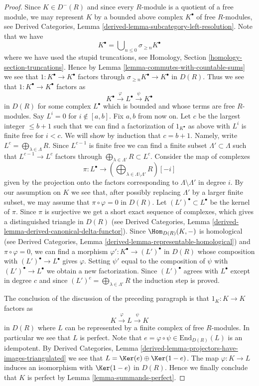 \begin{proof}
\medskip\noindent
Since $K \in D^{-}(R)$ and since every $R$-module is a quotient of a free
module, we may represent $K$ by a bounded above complex $K^\bullet$
of free $R$-modules, see
Derived Categories, Lemma \ref{derived-lemma-subcategory-left-resolution}.
Note that we have
$$
K^\bullet = \bigcup\nolimits_{n \leq 0} \sigma_{\geq n}K^\bullet
$$
where we have used the stupid truncations, see
Homology, Section \ref{homology-section-truncations}.
Hence by Lemma \ref{lemma-commutes-with-countable-sums} we see that
$1 : K^\bullet \to K^\bullet$ factors through
$\sigma_{\geq n}K^\bullet \to K^\bullet$ in $D(R)$.
Thus we see that $1 : K^\bullet \to K^\bullet$ factors as
$$
K^\bullet \xrightarrow{\varphi} L^\bullet \xrightarrow{\psi} K^\bullet
$$
in $D(R)$ for some complex $L^\bullet$ which is bounded and whose terms
are free $R$-modules. Say $L^i = 0$ for $i \not \in [a, b]$.
Fix $a, b$ from now on. Let $c$ be the largest integer $\leq b + 1$
such that we can find a factorization of $1_{K^\bullet}$ as above
with $L^i$ is finite free for $i < c$. We will show by induction that
$c = b + 1$. Namely, write $L^c = \bigoplus_{\lambda \in \Lambda} R$.
Since $L^{c - 1}$ is finite free we can find a finite subset
$\Lambda' \subset \Lambda$ such that $L^{c - 1} \to L^c$ factors
through $\bigoplus_{\lambda \in \Lambda'} R \subset L^c$. Consider the
map of complexes
$$
\pi :
L^\bullet
\longrightarrow
(\bigoplus\nolimits_{\lambda \in \Lambda \setminus \Lambda'} R)[-i]
$$
given by the projection onto the factors corresponding to
$\Lambda \setminus \Lambda'$ in degree $i$.
By our assumption on $K$ we see that, after possibly replacing $\Lambda'$ by
a larger finite subset, we may assume that $\pi \circ \varphi = 0$
in $D(R)$. Let $(L')^\bullet \subset L^\bullet$ be the kernel of $\pi$.
Since $\pi$ is surjective we get a short exact sequence of complexes,
which gives a distinguished triangle in $D(R)$ (see
Derived Categories, Lemma \ref{derived-lemma-derived-canonical-delta-functor}).
Since $\Hom_{D(R)}(K, -)$ is homological (see
Derived Categories, Lemma \ref{derived-lemma-representable-homological})
and $\pi \circ \varphi = 0$, we can find a morphism
$\varphi' : K^\bullet \to (L')^\bullet$ in $D(R)$ whose
composition with $(L')^\bullet \to L^\bullet$ gives $\varphi$.
Setting $\psi'$ equal to the composition of $\psi$ with
$(L')^\bullet \to L^\bullet$ we obtain a new factorization.
Since $(L')^\bullet$ agrees with $L^\bullet$ except in degree $c$
and since $(L')^c = \bigoplus_{\lambda \in \Lambda'} R$ the
induction step is proved.

\medskip\noindent
The conclusion of the discussion of the preceding paragraph is that
$1_K : K \to K$ factors as
$$
K \xrightarrow{\varphi} L \xrightarrow{\psi} K
$$
in $D(R)$ where $L$ can be represented by a finite
complex of free $R$-modules. In particular we see that $L$ is
perfect. Note that $e = \varphi \circ \psi \in \text{End}_{D(R)}(L)$
is an idempotent. By Derived Categories,
Lemma \ref{derived-lemma-projectors-have-images-triangulated}
we see that $L = \Ker(e) \oplus \Ker(1 - e)$.
The map $\varphi : K \to L$ induces an isomorphism with
$\Ker(1 - e)$ in $D(R)$. Hence we finally conclude that
$K$ is perfect by Lemma \ref{lemma-summands-perfect}.
\end{proof}

